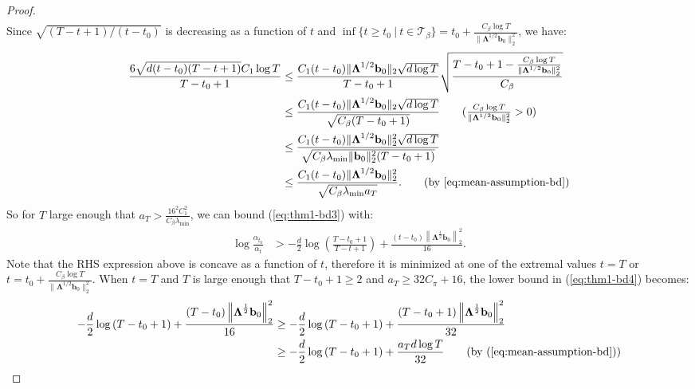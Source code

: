 \begin{proof}
\begin{align*}
\end{align*}
Since $\sqrt{(T-t+1)/(t-t_0)}$ is decreasing as a function of $t$ and $ \inf \{t \geq t_0 \:|\:t\in\mathcal{T}_\beta\} = t_0 + \frac{C_\beta\log T}{\lVert\boldsymbol{\Lambda}^{1/2}\mathbf{b}_0\rVert_2^2}$, we have:
\begin{align*}
    \frac{6\sqrt{d(t-t_0)(T-t+1)}C_1\log T}{T-t_0+1} &\leq \frac{C_1(t-t_0)\lVert\boldsymbol{\Lambda}^{1/2}\mathbf{b}_0\rVert_2\sqrt{d\log T}}{T-t_0+1}\sqrt{\frac{T-t_0 +1 - \frac{C_\beta\log T}{\lVert\boldsymbol{\Lambda}^{1/2}\mathbf{b}_0\rVert_2^2}}{C_\beta}} \\
    &\leq \frac{C_1(t-t_0)\lVert\boldsymbol{\Lambda}^{1/2}\mathbf{b}_0\rVert_2\sqrt{d\log T}}{\sqrt{C_\beta(T-t_0+1)}} \tag{$\frac{C_\beta\log T}{\lVert\boldsymbol{\Lambda}^{1/2}\mathbf{b}_0\rVert_2^2} > 0$}\\
    &\leq \frac{C_1(t-t_0)\lVert\boldsymbol{\Lambda}^{1/2}\mathbf{b}_0\rVert^2_2\sqrt{d\log T}}{\sqrt{C_\beta\lambda_{\min}\lVert\mathbf{b}_0\rVert^2_2(T-t_0+1)}} \\
    &\leq \frac{C_1(t-t_0)\lVert\boldsymbol{\Lambda}^{1/2}\mathbf{b}_0\rVert^2_2}{\sqrt{C_\beta\lambda_{\min}a_T}}. \tag{by \ref{eq:mean-assumption-bd}}
\end{align*}
So for $T$ large enough that $a_T > \frac{16^2C_1^2}{C_\beta\lambda_{\min}}$, we can bound (\ref{eq:thm1-bd3}) with:
\begin{align}
    \log \frac{\alpha_{t_0}}{\alpha_t} &> -\frac{d}{2}\log\left(\frac{T-t_0+1}{T-t+1}\right) +\frac{(t-t_0)\left\lVert\boldsymbol{\Lambda}^{\frac{1}{2}}\mathbf{b}_0\right\rVert_2^2}{16}. \label{eq:thm1-bd4}
\end{align}
Note that the RHS expression above is concave as a function of $t$, therefore it is minimized at one of the extremal values $t =T$ or $t = t_0 + \frac{C_\beta\log T}{\lVert\boldsymbol{\Lambda}^{1/2}\mathbf{b}_0\rVert_2^2}$. When $t = T$ and $T$ is large enough that $T-t_0+1 \geq 2$ and $a_T \geq 32C_\pi + 16$, the lower bound in (\ref{eq:thm1-bd4}) becomes:
\begin{align*}
    -\frac{d}{2}\log\left(T-t_0+1\right) +\frac{(T-t_0)\left\lVert\boldsymbol{\Lambda}^{\frac{1}{2}}\mathbf{b}_0\right\rVert_2^2}{16} &\geq -\frac{d}{2}\log\left(T-t_0+1\right) +\frac{(T-t_0+1)\left\lVert\boldsymbol{\Lambda}^{\frac{1}{2}}\mathbf{b}_0\right\rVert_2^2}{32} \\
    &\geq -\frac{d}{2}\log\left(T-t_0+1\right) +\frac{a_Td\log T}{32} \tag{by (\ref{eq:mean-assumption-bd})} \\

\end{align*}
\end{proof}
